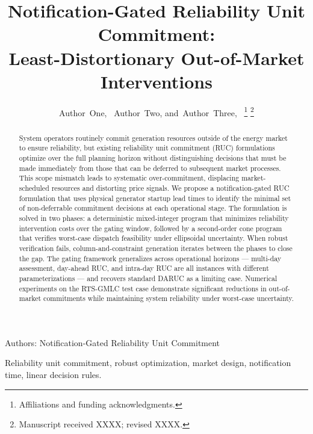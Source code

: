 \documentclass[journal]{IEEEtran}
\begin{document}
\title{Notification-Gated Reliability Unit Commitment:\\ Least-Distortionary Out-of-Market Interventions}

\author{Author~One,~
        Author~Two,
        and~Author~Three,~%
\thanks{Affiliations and funding acknowledgments.}%
\thanks{Manuscript received XXXX; revised XXXX.}}

%
{Authors: Notification-Gated Reliability Unit Commitment}

\maketitle

\begin{abstract}
System operators routinely commit generation resources outside of the
energy market to ensure reliability, but existing reliability unit
commitment (RUC) formulations optimize over the full planning horizon
without distinguishing decisions that must be made immediately from
those that can be deferred to subsequent market processes.
This scope mismatch leads to systematic over-commitment, displacing
market-scheduled resources and distorting price signals.
We propose a notification-gated RUC formulation that uses physical
generator startup lead times to identify the minimal set of
non-deferrable commitment decisions at each operational stage.
The formulation is solved in two phases: a deterministic
mixed-integer program that minimizes reliability intervention costs
over the gating window, followed by a second-order cone program that
verifies worst-case dispatch feasibility under ellipsoidal
uncertainty.
When robust verification fails, column-and-constraint generation
iterates between the phases to close the gap.
The gating framework generalizes across operational horizons ---
multi-day assessment, day-ahead RUC, and intra-day RUC are all
instances with different parameterizations --- and recovers standard
DARUC as a limiting case.
Numerical experiments on the RTS-GMLC test case demonstrate
significant reductions in out-of-market commitments while maintaining
system reliability under worst-case uncertainty.
\end{abstract}

\begin{IEEEkeywords}
Reliability unit commitment, robust optimization, market design,
notification time, linear decision rules.
\end{IEEEkeywords}
\end{document}
